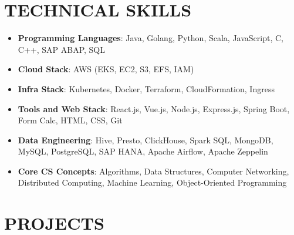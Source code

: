 \documentclass[a4paper,10pt]{article}
\begin{document}
\section*{\textbf{TECHNICAL SKILLS}}
\begin{itemize}[noitemsep, topsep=0pt]
    \item \textbf{Programming Languages}: Java, Golang, Python, Scala, JavaScript, C, C++, SAP ABAP, SQL
    \item \textbf{Cloud Stack}: AWS (EKS, EC2, S3, EFS, IAM)
    \item \textbf{Infra Stack}: Kubernetes, Docker, Terraform, CloudFormation, Ingress
    \item \textbf{Tools and Web Stack}: React.js, Vue.js, Node.js, Express.js, Spring Boot, Form Calc, HTML, CSS, Git
    \item \textbf{Data Engineering}: Hive, Presto, ClickHouse, Spark SQL, MongoDB, MySQL, PostgreSQL, SAP HANA, Apache Airflow, Apache Zeppelin
    \item \textbf{Core CS Concepts}: Algorithms, Data Structures, Computer Networking, Distributed Computing, Machine Learning, Object-Oriented Programming
\end{itemize}

\section*{\textbf{PROJECTS}}
\end{document}
